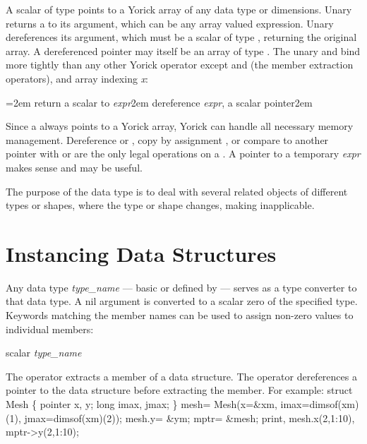 A scalar of type  points to a Yorick array of any data
type or dimensions.  Unary \kbd{\&} returns a  to its
argument, which can be any array valued expression.  Unary \kbd{*}
dereferences its argument, which must be a scalar of type
, returning the original array.  A dereferenced pointer
may itself be an array of type .  The unary \kbd{\&} and
\kbd{*} bind more tightly than any other Yorick operator except
 and \kbd{->} (the member extraction operators), and array
indexing {\it x\/}:

\keyindent=2em
       {return a scalar  to {\it expr}\hglue2em}
       {dereference {\it expr}, a scalar pointer\hglue2em}
\endindentedkeys

Since a  always points to a Yorick array, Yorick can
handle all necessary memory management.  Dereference \kbd{*} or
\kbd{->}, copy by assignment \kbd{=}, or compare to another pointer
with \kbd{==} or \kbd{!=} are the only legal operations on a .
A pointer to a temporary {\it expr} makes sense and may be useful.

The purpose of the  data type is to deal with several related
objects of different types or shapes, where the type or shape changes,
making  inapplicable.

\section{Instancing Data Structures}

Any data type {\it type\_name} --- basic or defined by 
--- serves as a type converter to that data type.  A nil argument is
converted to a scalar zero of the specified type.  Keywords matching
the member names can be used to assign non-zero values to individual
members:

     {scalar {\it type\_name}}

The  operator extracts a member of a data structure.  The
\kbd{->} operator dereferences a pointer to the data structure before
extracting the member.  For example:
\beginexample
struct Mesh \{ pointer x, y; long imax, jmax; \}
mesh= Mesh(x=\&xm,
           imax=dimsof(xm)(1), jmax=dimsof(xm)(2));
mesh.y= \&ym;        mptr= \&mesh;
print, mesh.x(2,1:10), mptr->y(2,1:10);
\endexample

